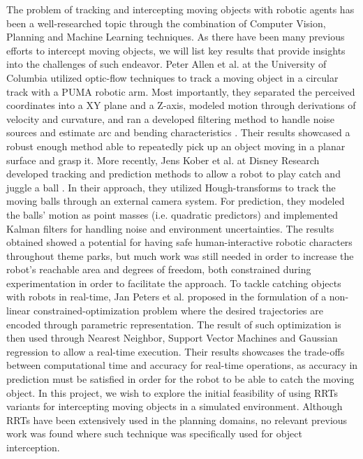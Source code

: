 \documentclass[letterpaper, 10 pt, conference]{ieeeconf}  %
\begin{document}
The problem of tracking and intercepting moving objects with robotic agents has
been a well-researched topic through the combination of Computer Vision,
Planning and Machine Learning techniques. As there have been many previous efforts to intercept moving objects,
we will list key results that provide insights into the challenges of such
endeavor. Peter Allen et al. at the University of Columbia utilized optic-flow
techniques to track a moving object in a circular track with a PUMA robotic
arm. Most importantly, they separated the perceived coordinates into a XY plane
and a Z-axis, modeled motion through derivations of velocity and curvature, and
ran a developed filtering method to handle noise sources and estimate arc and
bending characteristics \cite{Allen91automatedtracking}. Their results
showcased a robust enough method able to repeatedly pick up an object moving in
a planar surface and grasp it.  More recently, Jens Kober et al. at Disney
Research developed tracking and prediction methods to allow a robot to play
catch and juggle a ball \cite{koberplaying}. In their approach, they utilized
Hough-transforms to track the moving balls through an external camera system.
For prediction, they modeled the balls’ motion as point masses (i.e. quadratic
predictors) and implemented Kalman filters for handling noise and environment
uncertainties. The results obtained showed a potential for having safe
human-interactive robotic characters throughout theme parks, but much work was
still needed in order to increase the robot's reachable area and degrees of
freedom, both constrained during experimentation in order to facilitate the
approach. To tackle catching objects with robots in real-time, Jan Peters et
al. proposed in \cite{lampariello2011trajectory} the formulation of a
non-linear constrained-optimization problem where the desired trajectories are
encoded through parametric representation. The result of such optimization is
then used through Nearest Neighbor, Support Vector Machines and Gaussian
regression to allow a real-time execution. Their results showcases the
trade-offs between computational time and accuracy for real-time operations, as
accuracy in prediction must be satisfied in order for the robot to be able to
catch the moving object. In this project, we wish to explore the initial
feasibility of using RRTs variants for intercepting moving objects in a
simulated environment. Although RRTs have been extensively used in the planning
domains, no relevant previous work was found where such technique was
specifically used for object interception.
\end{document}
